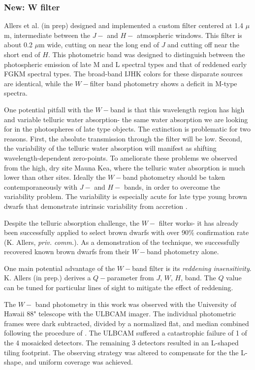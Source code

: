 \documentclass[12pt,preprint]{aastex}
\begin{document}
\subsubsection{New: W filter}
Allers et al. (in prep) designed and implemented a custom filter centered at 1.4 $\mu$m, intermediate between the $J-$ and $H-$ atmospheric windows.  This filter is about 0.2 $\mu$m wide, cutting on near the long end of $J$ and cutting off near the short end of $H$.  This photometric band was designed to distinguish between the photospheric emission of late M and L spectral types and that of reddened early FGKM spectral types.  The broad-band IJHK colors for these disparate sources are identical, while the $W-$filter band photometry shows a deficit in M-type spectra.

One potential pitfall with the $W-$band is that this wavelength region has high and variable telluric water absorption- the same water absorption we are looking for in the photospheres of late type objects.  The extinction is problematic for two reasons.  First, the absolute transmission through the filter will be low.  Second, the variability of the telluric water absorption will manifest as shifting wavelength-dependent zero-points. To ameliorate these problems we observed from the high, dry site Mauna Kea, where the telluric water absorption is much lower than other sites.  Ideally the $W-$band photometry should be taken contemporaneously with $J-$ and $H-$ bands, in order to overcome the variability problem.  The variability is especially acute for late type young brown dwarfs that demonstrate intrinsic variability from accretion \citep{2008A&A...485..155A, 2014AJ....147...82C}.

Despite the telluric absorption challenge, the $W-$ filter works- it has already been successfully applied to select brown dwarfs with over 90\% confirmation rate (K. Allers, \emph{priv. comm.}).  As a demonstration of the technique, we successfully recovered known brown dwarfs from their $W-$band photometry alone.  

One main potential advantage of the $W-$band filter is its \emph{reddening insensitivity}.  K. Allers (in prep.) derives a $Q-$parameter from $J$, $W$, $H$, band.  The $Q$ value can be tuned for particular lines of sight to mitigate the effect of reddening.  

The $W-$ band photometry in this work was observed with the University of Hawaii 88" telescope with the ULBCAM imager.  The individual photometric frames were dark subtracted, divided by a normalized flat, and median combined following the procedure of \cite{allers06}.  The ULBCAM suffered a catastrophic failure of 1 of the 4 mosaicked detectors.  The remaining 3 detectors resulted in an L-shaped tiling footprint.  The observing strategy was altered to compensate for the the L-shape, and uniform coverage was achieved.
\end{document}
